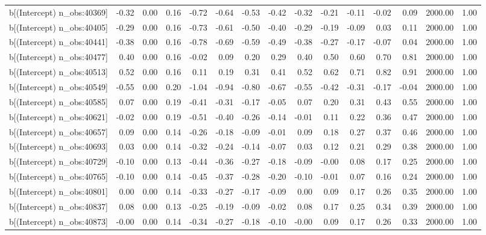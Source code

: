 \begin{table}[ht]
\begin{tabular}{rrrrrrrrrrrrrrr}
  b[(Intercept) n\_obs:40369] & -0.32 & 0.00 & 0.16 & -0.72 & -0.64 & -0.53 & -0.42 & -0.32 & -0.21 & -0.11 & -0.02 & 0.09 & 2000.00 & 1.00 \\ 
  b[(Intercept) n\_obs:40405] & -0.29 & 0.00 & 0.16 & -0.73 & -0.61 & -0.50 & -0.40 & -0.29 & -0.19 & -0.09 & 0.03 & 0.11 & 2000.00 & 1.00 \\ 
  b[(Intercept) n\_obs:40441] & -0.38 & 0.00 & 0.16 & -0.78 & -0.69 & -0.59 & -0.49 & -0.38 & -0.27 & -0.17 & -0.07 & 0.04 & 2000.00 & 1.00 \\ 
  b[(Intercept) n\_obs:40477] & 0.40 & 0.00 & 0.16 & -0.02 & 0.09 & 0.20 & 0.29 & 0.40 & 0.50 & 0.60 & 0.70 & 0.81 & 2000.00 & 1.00 \\ 
  b[(Intercept) n\_obs:40513] & 0.52 & 0.00 & 0.16 & 0.11 & 0.19 & 0.31 & 0.41 & 0.52 & 0.62 & 0.71 & 0.82 & 0.91 & 2000.00 & 1.00 \\ 
  b[(Intercept) n\_obs:40549] & -0.55 & 0.00 & 0.20 & -1.04 & -0.94 & -0.80 & -0.67 & -0.55 & -0.42 & -0.31 & -0.17 & -0.04 & 2000.00 & 1.00 \\ 
  b[(Intercept) n\_obs:40585] & 0.07 & 0.00 & 0.19 & -0.41 & -0.31 & -0.17 & -0.05 & 0.07 & 0.20 & 0.31 & 0.43 & 0.55 & 2000.00 & 1.00 \\ 
  b[(Intercept) n\_obs:40621] & -0.02 & 0.00 & 0.19 & -0.51 & -0.40 & -0.26 & -0.14 & -0.01 & 0.11 & 0.22 & 0.36 & 0.47 & 2000.00 & 1.00 \\ 
  b[(Intercept) n\_obs:40657] & 0.09 & 0.00 & 0.14 & -0.26 & -0.18 & -0.09 & -0.01 & 0.09 & 0.18 & 0.27 & 0.37 & 0.46 & 2000.00 & 1.00 \\ 
  b[(Intercept) n\_obs:40693] & 0.03 & 0.00 & 0.14 & -0.32 & -0.24 & -0.14 & -0.07 & 0.03 & 0.12 & 0.21 & 0.29 & 0.38 & 2000.00 & 1.00 \\ 
  b[(Intercept) n\_obs:40729] & -0.10 & 0.00 & 0.13 & -0.44 & -0.36 & -0.27 & -0.18 & -0.09 & -0.00 & 0.08 & 0.17 & 0.25 & 2000.00 & 1.00 \\ 
  b[(Intercept) n\_obs:40765] & -0.10 & 0.00 & 0.14 & -0.45 & -0.37 & -0.28 & -0.20 & -0.10 & -0.01 & 0.07 & 0.16 & 0.24 & 2000.00 & 1.00 \\ 
  b[(Intercept) n\_obs:40801] & 0.00 & 0.00 & 0.14 & -0.33 & -0.27 & -0.17 & -0.09 & 0.00 & 0.09 & 0.17 & 0.26 & 0.35 & 2000.00 & 1.00 \\ 
  b[(Intercept) n\_obs:40837] & 0.08 & 0.00 & 0.13 & -0.25 & -0.19 & -0.09 & -0.02 & 0.08 & 0.17 & 0.25 & 0.34 & 0.39 & 2000.00 & 1.00 \\ 
  b[(Intercept) n\_obs:40873] & -0.00 & 0.00 & 0.14 & -0.34 & -0.27 & -0.18 & -0.10 & -0.00 & 0.09 & 0.17 & 0.26 & 0.33 & 2000.00 & 1.00 \\ 

\end{tabular}
\end{table}
